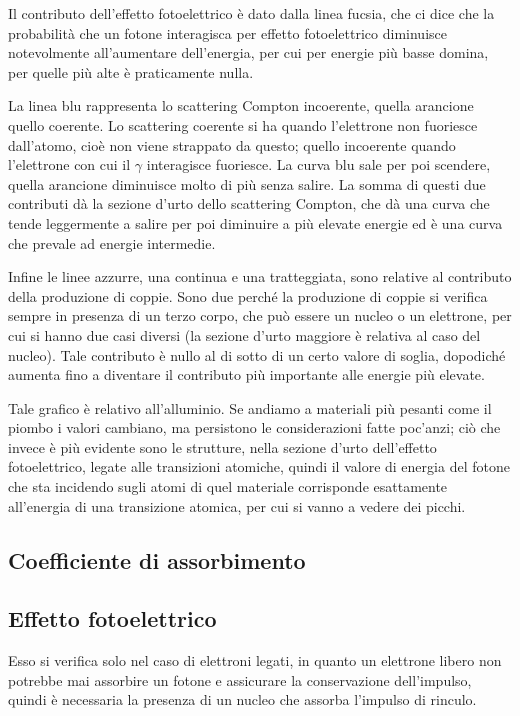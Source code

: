 Il contributo dell'effetto fotoelettrico è dato dalla linea fucsia, che ci dice che la probabilità che un fotone interagisca per effetto fotoelettrico diminuisce notevolmente all'aumentare dell'energia, per cui per energie più basse domina, per quelle più alte è praticamente nulla.

La linea blu rappresenta lo scattering Compton incoerente, quella arancione quello coerente. Lo scattering coerente si ha quando l'elettrone non fuoriesce dall'atomo, cioè non viene strappato da questo; quello incoerente quando l'elettrone con cui il $\gamma$ interagisce fuoriesce. La curva blu sale per poi scendere, quella arancione diminuisce molto di più senza salire. La somma di questi due contributi dà la sezione d'urto dello scattering Compton, che dà una curva che tende leggermente a salire per poi diminuire a più elevate energie ed è una curva che prevale ad energie intermedie.

Infine le linee azzurre, una continua e una tratteggiata, sono relative al contributo della produzione di coppie. Sono due perché la produzione di coppie si verifica sempre in presenza di un terzo corpo, che può essere un nucleo o un elettrone, per cui si hanno due casi diversi (la sezione d'urto maggiore è relativa al caso del nucleo). Tale contributo è nullo al di sotto di un certo valore di soglia, dopodiché aumenta fino a diventare il contributo più importante alle energie più elevate.

Tale grafico è relativo all'alluminio. Se andiamo a materiali più pesanti come il piombo i valori cambiano, ma persistono le considerazioni fatte poc'anzi; ciò che invece è più evidente sono le strutture, nella sezione d'urto dell'effetto fotoelettrico, legate alle transizioni atomiche, quindi il valore di energia del fotone che sta incidendo sugli atomi di quel materiale corrisponde esattamente all'energia di una transizione atomica, per cui si vanno a vedere dei picchi.

\subsection{Coefficiente di assorbimento}

\subsection{Effetto fotoelettrico}

Esso si verifica solo nel caso di elettroni legati, in quanto un elettrone libero non potrebbe mai assorbire un fotone e assicurare la conservazione dell'impulso, quindi è necessaria la presenza di un nucleo che assorba l'impulso di rinculo.

